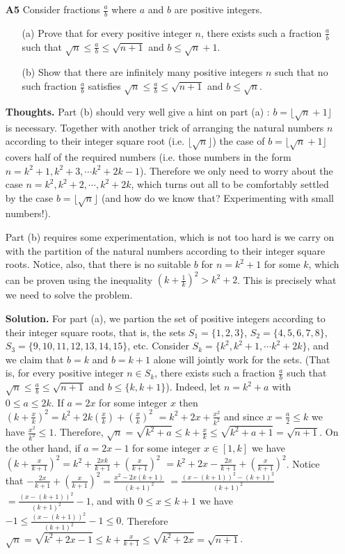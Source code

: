 \documentclass[11pt,a4paper]{article}
\begin{document}
\begin{itemize}
\item[\textbf{A5}]
Consider fractions $\frac{a}{b}$ where $a$ and $b$ are positive integers.
\begin{itemize}
\item[(a)]
Prove that for every positive integer $n$, there exists such a fraction $\frac{a}{b}$ such that $\sqrt{n} \le \frac{a}{b} \le \sqrt{n+1}$ and $b \le \sqrt{n}+1$.
\item[(b)]
Show that there are infinitely many positive integers $n$ such that no such fraction $\frac{a}{b}$ satisfies $\sqrt{n} \le \frac{a}{b} \le \sqrt{n+1}$ and $b \le \sqrt{n}$. 
\end{itemize}

\textbf{Thoughts.} 
Part (b) should very well give a hint on part (a) : $b=\lfloor\sqrt{n}+1\rfloor$ is necessary. 
Together with another trick of arranging the natural numbers $n$ according to their integer square root 
(i.e. $\lfloor\sqrt{n}\rfloor$) the case of $b=\lfloor\sqrt{n}+1\rfloor$ covers half of the required numbers 
(i.e. those numbers in the form $n=k^2+1, k^2+3, \cdots k^2+2k-1$). 
Therefore we only need to worry about the case $n=k^2, k^2+2, \cdots , k^2+2k$, 
which turns out all to be comfortably settled by the case $b=\lfloor\sqrt{n}\rfloor$
(and how do we know that? Experimenting with small numbers!). 

Part (b) requires some experimentation, which is not too hard is we carry on with the partition of the natural numbers according to their integer square roots. 
Notice, also, that there is no suitable $b$ for $n=k^2+1$ for some $k$, which can be proven using the inequality 
$(k+\frac 1k)^2>k^2+2$. This is precisely what we need to solve the problem. 

\textbf{Solution.} 
For part (a), we partion the set of positive integers according to their integer square roots, 
that is, the sets $S_1=\{1,2,3\}$, $S_2=\{4,5,6,7,8\}$, $S_3=\{9,10,11,12,13,14,15\}$, etc. 
Consider $S_k=\{k^2, k^2+1, \cdots k^2+2k\}$, 
and we claim that $b=k$ and $b=k+1$ alone will jointly work for the sets. 
(That is, for every positive integer $n\in S_k$, there exists such a fraction $\frac{a}{b}$ such that $\sqrt{n} \le \frac{a}{b} \le \sqrt{n+1}$ and $b \le \{k, k+1\}$). 
Indeed, let $n=k^2+a$ with $0\le a\le 2k$. 
If $a=2x$ for some integer $x$ then 
$(k+\frac xk)^2=k^2+ 2k\left(\frac xk\right)+\left(\frac xk\right)^2$
$=k^2+2x+\frac{x^2}{k^2}$
and since $x=\frac a2\le k$ we have $\frac{x^2}{k^2}\le 1$. 
Therefore, 
$\sqrt{n}=\sqrt{k^2+a}\le k+\frac xk\le\sqrt{k^2+a+1}=\sqrt{n+1}$. 
On the other hand, if $a=2x-1$ for some integer $x\in [1, k]$ we have 
$(k+\frac x{k+1})^2=k^2+\frac{2xk}{k+1}+(\frac x{k+1})^2$
$=k^2+2x-\frac{2x}{k+1}+(\frac x{k+1})^2$. 
Notice that $-\frac{2x}{k+1}+(\frac x{k+1})^2=\frac{x^2-2x(k+1)}{(k+1)^2}$
$=\frac{(x-(k+1))^2-(k+1)^2}{(k+1)^2}$
$=\frac{(x-(k+1))^2}{(k+1)^2}-1$, 
and with $0\le x\le k+1$ we have 
$-1\le \frac{(x-(k+1))^2}{(k+1)^2}-1\le 0$. 
Therefore 
$\sqrt{n}=\sqrt{k^2+2x-1}\le k+\frac x{k+1}\le \sqrt{k^2+2x}=\sqrt{n+1}$. 


\end{itemize}
\end{document}
